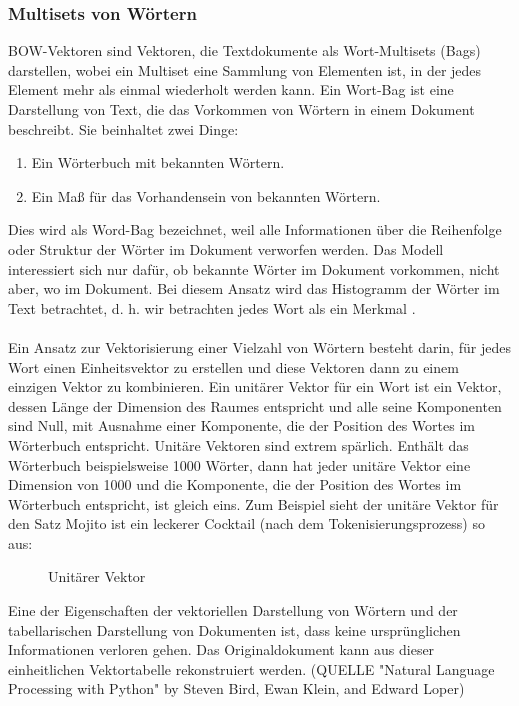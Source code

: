 \subsubsection{Multisets von Wörtern}
\ac{BOW}-Vektoren sind Vektoren, die Textdokumente als Wort-Multisets (Bags) darstellen, wobei ein Multiset eine Sammlung von Elementen ist, in der jedes Element mehr als einmal wiederholt werden kann. 
Ein Wort-Bag ist eine Darstellung von Text, die das Vorkommen von Wörtern in einem Dokument beschreibt. 
Sie beinhaltet zwei Dinge:
\begin{enumerate}
    \item Ein Wörterbuch mit bekannten Wörtern.
    \item Ein Maß für das Vorhandensein von bekannten Wörtern.
\end{enumerate}
Dies wird als \glqq{}Word-Bag\grqq{} bezeichnet, weil alle Informationen über die Reihenfolge oder Struktur der Wörter im Dokument verworfen werden. 
Das Modell interessiert sich nur dafür, ob bekannte Wörter im Dokument vorkommen, nicht aber, wo im Dokument. 
Bei diesem Ansatz wird das Histogramm der Wörter im Text betrachtet, d. h. wir betrachten jedes Wort als ein Merkmal \cite{goldberg_neural_2017}.\\\\
Ein Ansatz zur Vektorisierung einer Vielzahl von Wörtern besteht darin, für jedes Wort einen Einheitsvektor zu erstellen und diese Vektoren dann zu einem einzigen Vektor zu kombinieren. 
Ein unitärer Vektor für ein Wort ist ein Vektor, dessen Länge der Dimension des Raumes entspricht und alle seine Komponenten sind Null, mit Ausnahme einer Komponente, die der Position des Wortes im Wörterbuch entspricht. Unitäre Vektoren sind extrem spärlich. 
Enthält das Wörterbuch beispielsweise 1000 Wörter, dann hat jeder unitäre Vektor eine Dimension von 1000 und die Komponente, die der Position des Wortes im Wörterbuch entspricht, ist gleich eins.
Zum Beispiel sieht der unitäre Vektor für den Satz \glqq Mojito ist ein leckerer Cocktail\grqq{} (nach dem Tokenisierungsprozess) so aus:
\begin{figure}[H]
    \centering
    \caption{\label{figure:Unitaere_Vektoe}Unitärer Vektor}
\end{figure}
\noindent
Eine der Eigenschaften der vektoriellen Darstellung von Wörtern und der tabellarischen Darstellung von Dokumenten ist, dass keine ursprünglichen Informationen verloren gehen. 
Das Originaldokument kann aus dieser einheitlichen Vektortabelle rekonstruiert werden. (QUELLE "Natural Language Processing with Python" by Steven Bird, Ewan Klein, and Edward Loper) 
